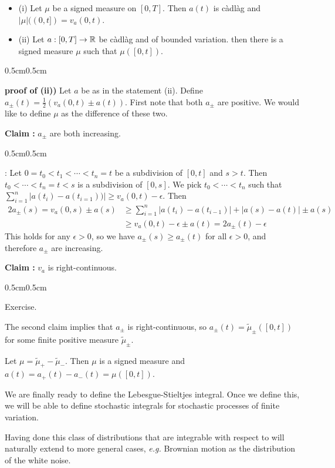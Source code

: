 \documentclass[12pt,a4paper]{article}
\newenvironment{proof}
{\begin{changemargin}{0.5cm}{0.5cm} 
	}%
	{\end{changemargin}
}
\newenvironment{subproof}
{\begin{changemargin}{0.5cm}{0.5cm} 
	}%
	{\end{changemargin}
}
\renewenvironment{i}
{\begin{itemize} 
	}%
	{\end{itemize}
}
\newenvironment{p}
{\begin{proof} 
	}%
	{\end{proof}
}
\begin{document}
\prop \begin{i}
\item[(i)] Let $\mu$ be a signed measure on $[0,T]$. Then $a(t)$ is c\`adl\`ag and $|\mu|((0,t]) = v_a(0,t)$.
\item[(ii)] Let $a: [0,T] \rightarrow \mathbb{R}$ be c\`adl\`ag and of bounded variation. then there is a signed measure $\mu$ such that $\mu([0,t])$.
\end{i}
\begin{p}
\textbf{proof of (ii))} Let $a$ be as in the statement (ii). Define $a_{\pm} (t) = \frac{1}{2} (v_a(0,t)\pm a(t))$. First note that both $a_{\pm}$ are positive. We would like to define $\mu$ as the difference of these two.

\textbf{Claim :} $a_{\pm}$ are both increasing.
\begin{subproof}
: Let $0=t_0 < t_1<\cdots < t_n =t$ be a subdivision of $[0,t]$ and $s>t$. Then $t_0 < \cdots< t_n =t<s$ is a subdivision of $[0,s]$. We pick $t_0<\cdots < t_n$ such that $\sum_{i=1}^n |a(t_i)- a(t_{i=1}))| \geq v_a(0,t) - \epsilon$. Then
\begin{align*}
2a_{\pm}(s) = v_a(0,s) \pm a(s) &\geq \sum_{i=1}^n |a(t_i) - a(t_{i-1})| + |a(s) - a(t)| \pm a(s) \\
& \geq v_a(0,t) - \epsilon \pm a(t) = 2a_{\pm}(t) - \epsilon
\end{align*}
This holds for any $\epsilon >0$, so we have $a_{\pm}(s) \geq a_{\pm}(t)$ for all $\epsilon>0$, and therefore $a_{\pm}$ are increasing.
\end{subproof} 
\textbf{Claim :} $v_a$ is right-continuous.
\begin{subproof}
Exercise.
\end{subproof}
The second claim implies that $a_{\pm}$ is right-continuous, so $a_{\pm}(t) = \tilde{\mu}_{\pm}([0,t])$ for some finite positive measure $\tilde{\mu}_{\pm}$.

\quad Let $\mu = \tilde{\mu}_+ - \tilde{\mu}_-$. Then $\mu$ is a signed measure and $a(t) = a_+(t) - a_-(t) =\mu ([0,t])$.

\eop
\end{p}
\s

We are finally ready to define the Lebesgue-Stieltjes integral. Once we define this, we will be able to define stochastic integrals for stochastic processes of finite variation.

\quad Having done this class of distributions that are integrable with respect to will naturally extend to more general cases, \textit{e.g.} Brownian motion as the distribution of the white noise.
\s
\end{document}
